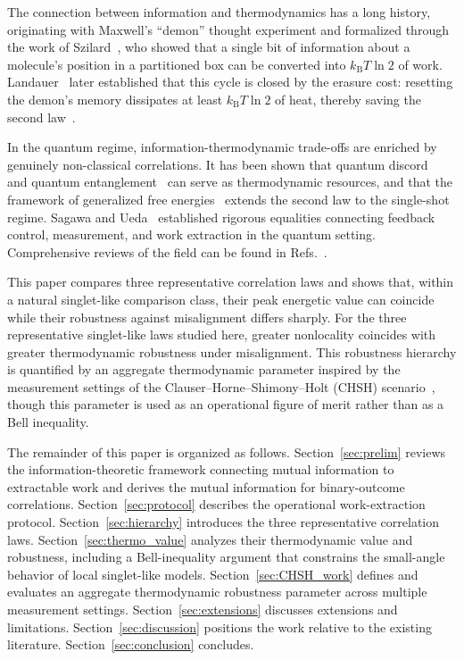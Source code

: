 \documentclass[pra,twocolumn,showpacs,preprintnumbers,amsmath,amssymb,longbibliography,
               superscriptaddress]{revtex4-2}
\begin{document}
{The connection between information and thermodynamics has a long
history, originating with Maxwell's ``demon'' thought experiment and
formalized through the work of Szilard~\cite{Szilard-1929,maxwell-demon2}, who showed
that a single bit of information about a molecule's position in a
partitioned box can be converted into $k_{\mathrm{B}}T\ln 2$ of work.
Landauer~\cite{landauer:61} later established that this cycle is closed
by the erasure cost: resetting the demon's memory dissipates at least
$k_{\mathrm{B}}T\ln 2$ of heat, thereby saving the second
law~\cite{bennett-82,Maruyama2009}.}

{In the quantum regime, information-thermodynamic trade-offs are enriched
by genuinely non-classical correlations.
It has been shown that quantum
discord~\cite{Zurek2003,Oppenheim2002} and quantum
entanglement~\cite{delrio2011thermodynamic} can serve as thermodynamic
resources, and that the framework of generalized free
energies~\cite{Brandao2015,Brandao2015b,Horodecki2013} extends the
second law to the single-shot regime.
Sagawa and Ueda~\cite{SagawaUeda2008,sagawa2010} established
rigorous equalities connecting feedback control, measurement,
and work extraction in the quantum setting.
Comprehensive reviews of the field can be found in
Refs.~\cite{Goold2016,Vinjanampathy2016}.}

{This paper compares three representative correlation laws and shows that,
within a natural singlet-like comparison class, their peak energetic
value can coincide while their robustness against misalignment differs
sharply.
For the three representative singlet-like laws studied here, greater
nonlocality coincides with greater thermodynamic robustness under
misalignment.
This robustness hierarchy is quantified by an aggregate thermodynamic
parameter inspired by the measurement settings of the
Clauser--Horne--Shimony--Holt (CHSH)
scenario~\cite{chsh,bell,Brunner2014}, though this parameter is used as
an operational figure of merit rather than as a Bell inequality.}

{The remainder of this paper is organized as follows.
Section~\ref{sec:prelim} reviews the information-theoretic framework
connecting mutual information to extractable work and derives the mutual
information for binary-outcome correlations.
Section~\ref{sec:protocol} describes the operational
work-extraction protocol.
Section~\ref{sec:hierarchy} introduces the three representative
correlation laws.
Section~\ref{sec:thermo_value} analyzes their thermodynamic value and
robustness, including a Bell-inequality argument that constrains the
small-angle behavior of local singlet-like models.
Section~\ref{sec:CHSH_work} defines and evaluates an aggregate
thermodynamic robustness parameter across multiple measurement
settings.
Section~\ref{sec:extensions} discusses extensions and limitations.
Section~\ref{sec:discussion} positions the work relative to the
existing literature.
Section~\ref{sec:conclusion} concludes.}
\end{document}
